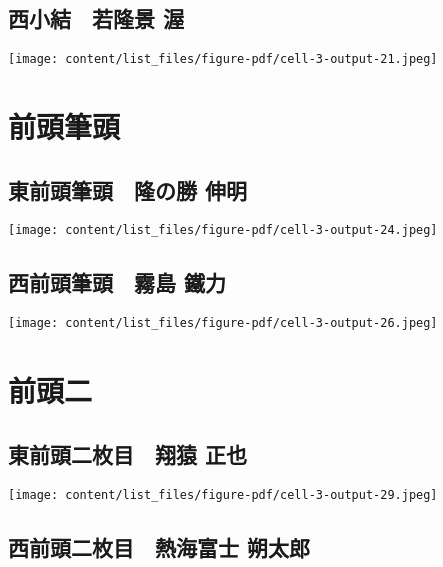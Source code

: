 \documentclass[
  letterpaper,
]{bxjsbook}
\begin{document}
\subsection{西小結　若隆景
渥}\label{ux897fux5c0fux7d50-ux82e5ux9686ux666f-ux6e25}

\texttt{[image: content/list\_files/figure-pdf/cell-3-output-21.jpeg]}

\section{前頭筆頭}\label{ux524dux982dux7b46ux982d}

\subsection{東前頭筆頭　隆の勝
伸明}\label{ux6771ux524dux982dux7b46ux982d-ux9686ux306eux52dd-ux4f38ux660e}

\texttt{[image: content/list\_files/figure-pdf/cell-3-output-24.jpeg]}

\subsection{西前頭筆頭　霧島
鐵力}\label{ux897fux524dux982dux7b46ux982d-ux9727ux5cf6-ux9435ux529b}

\texttt{[image: content/list\_files/figure-pdf/cell-3-output-26.jpeg]}

\section{前頭二}\label{ux524dux982dux4e8c}

\subsection{東前頭二枚目　翔猿
正也}\label{ux6771ux524dux982dux4e8cux679aux76ee-ux7fd4ux733f-ux6b63ux4e5f}

\texttt{[image: content/list\_files/figure-pdf/cell-3-output-29.jpeg]}

\subsection{西前頭二枚目　熱海富士
朔太郎}\label{ux897fux524dux982dux4e8cux679aux76ee-ux71b1ux6d77ux5bccux58eb-ux6714ux592aux90ce}
\end{document}
